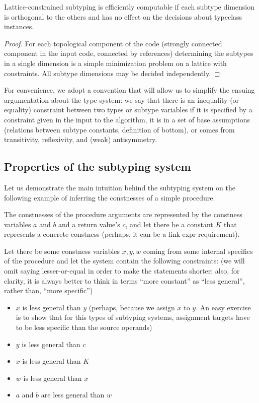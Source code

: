 \begin{observe}
    Lattice-constrained subtyping is efficiently computable if each subtype dimension is orthogonal to the others and has no effect on the decisions about typeclass instances.

    \begin{proof}
        For each topological component of the code (strongly connected component in the input code, connected by references) determining the subtypes in a single dimension is a simple minimization problem on a lattice with constraints. All subtype dimensions may be decided independently.
    \end{proof}
\end{observe}

\begin{conv}
    For convenience, we adopt a convention that will allow us to simplify the ensuing argumentation about the type system: we say that there is an inequality (or equality) constraint between two types or subtype variables if it is specified by a constraint given in the input to the algorithm, it is in a set of base assumptions (relations between subtype constants, definition of bottom), or comes from transitivity, reflexivity, and (weak) antisymmetry.
\end{conv}

\subsection{Properties of the subtyping system}
\label{subtyping-idea}

Let us demonstrate the main intuition behind the subtyping system on the following example of inferring the constnesses of a simple procedure.

The constnesses of the procedure arguments are represented by the constness variables $a$ and $b$ and a return value's $c$, and let there be a constant $K$ that represents a concrete constness (perhaps, it can be a link-expr requirement).

Let there be some constness variables $x, y, w$ coming from some internal specifics of the procedure and let the system contain the following constraints: (we will omit saying lesser-or-equal in order to make the statements shorter; also, for clarity, it is always better to think in terms ``more constant'' as ``less general'', rather than, ``more specific'')

\begin{itemize}
    \item $x$ is less general than $y$ (perhaps, because we assign $x$ to $y$. An easy exercise is to show that for this types of subtyping systems, assignment targets have to be less specific than the source operands)
    \item $y$ is less general than $c$
    \item $x$ is less general than $K$
    \item $w$ is less general than $x$
    \item $a$ and $b$ are less general than $w$
\end{itemize}

